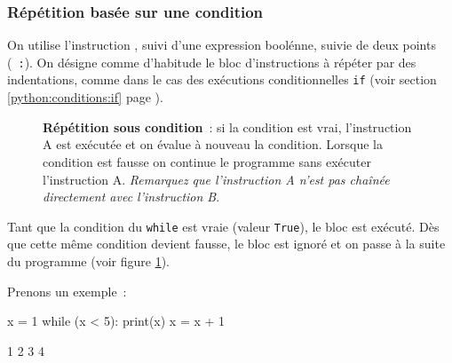 \subsubsection{Répétition basée sur une condition}
On utilise l'instruction , suivi d'une expression boolénne, suivie de deux points
 (~\texttt{:}). On désigne comme d'habitude le bloc d'instructions à répéter par des indentations,
 comme dans le cas des exécutions conditionnelles \texttt{if} (voir section \ref{python:conditions:if}
 page \pageref{python:conditions:if}).

 \begin{figure}[h]
\caption{\textbf{Répétition sous condition}~: si la condition est vrai, l'instruction A
est exécutée et on évalue à nouveau la condition. Lorsque la condition est fausse
 on continue le programme sans exécuter l'instruction A. \textit{Remarquez que l'instruction A
 n'est pas chaînée directement avec l'instruction B}.}\label{python:conditions:figures:while}
\centering
{}
\end{figure}

 Tant que la condition du \texttt{while} est vraie (valeur \texttt{True}), le bloc est exécuté.
 Dès que cette même condition devient fausse, le bloc est ignoré et on passe à la suite du programme
 (voir figure \ref{python:conditions:figures:while}).

 Prenons un exemple~:

 \begin{multicols}{2}
\begin{pythonexemple}
x = 1
while (x < 5):
    print(x)
    x = x + 1
\end{pythonexemple}

\begin{result}
1
2
3
4
\end{result}
\end{multicols}

